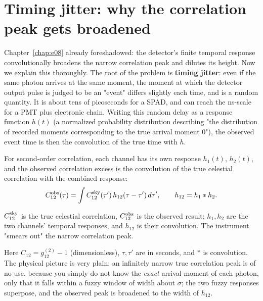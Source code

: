 \section{Timing jitter: why the correlation peak gets broadened}
\label{sec:e13-jitter}

Chapter~\ref{chap:e08} already foreshadowed: the detector's finite temporal response convolutionally broadens the narrow correlation peak and dilutes its height. Now we explain this thoroughly. The root of the problem is \textbf{timing jitter}: even if the same photon arrives at the same moment, the moment at which the detector output pulse is judged to be an "event" differs slightly each time, and is a random quantity. It is about tens of picoseconds for a SPAD, and can reach the ns-scale for a PMT plus electronic chain. Writing this random delay as a response function $h(t)$ (a normalized probability distribution describing "the distribution of recorded moments corresponding to the true arrival moment 0"), the observed event time is then the convolution of the true time with $h$.

For second-order correlation, each channel has its own response $h_1(t)$, $h_2(t)$, and the observed correlation excess is the convolution of the true celestial correlation with the combined response:
\begin{equation}
  C^{\rm obs}_{12}(\tau)
  =
  \int C^{\rm sky}_{12}(\tau')\,
  h_{12}(\tau-\tau')\,d\tau',
  \qquad
  h_{12}=h_1*h_2.
  \label{eq:e13-response-convolution}
\end{equation}
\begin{formulaexplain}
$C^{\rm sky}_{12}$ is the true celestial correlation, $C^{\rm obs}_{12}$ is the observed result; $h_1,h_2$ are the two channels' temporal responses, and $h_{12}$ is their convolution. The instrument "smears out" the narrow correlation peak.
\end{formulaexplain}
Here $C_{12}=g^{(2)}_{12}-1$ (dimensionless), $\tau,\tau'$ are in seconds, and $*$ is convolution. The physical picture is very plain: an infinitely narrow true correlation peak is of no use, because you simply do not know the \emph{exact} arrival moment of each photon, only that it falls within a fuzzy window of width about $\sigma$; the two fuzzy responses superpose, and the observed peak is broadened to the width of $h_{12}$.

